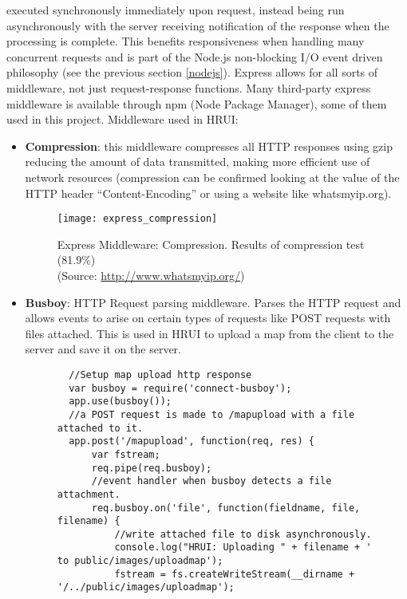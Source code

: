 executed synchronously immediately upon request, instead being run asynchronously with the server receiving notification of the response
when the processing is complete. This benefits responsiveness when handling many concurrent requests and is part of the Node.js
non-blocking I/O event driven philosophy (see the previous section \ref{nodejs}). Express allows for all sorts of middleware, not just
request-response functions. Many third-party express middleware is available through npm (Node Package Manager), some of them used in
this project. Middleware used in HRUI:
\begin{itemize}
  \item \textbf{Compression}: this middleware compresses all HTTP responses using gzip reducing the amount of data transmitted, making
  more efficient use of network resources (compression can be confirmed looking at the value of the HTTP header ``Content-Encoding'' or
  using a website like whatsmyip.org).
  \begin{figure}[H]
  \captionsetup{justification=centering}
  \begin{center}
    \texttt{[image: express\_compression]}
  \end{center}
  \caption{Express Middleware: Compression. Results of compression test (81.9\%)\\(Source: \url{http://www.whatsmyip.org/})}
  \end{figure}
  \item \textbf{Busboy}: HTTP Request parsing middleware. Parses the HTTP request and allows events to arise on certain types of
  requests like POST requests with files attached. This is used in HRUI to upload a map from the client to the server and save it on the
  server.
  \begin{figure}[H]
  \centering
  \captionsetup{justification=centering}
  \begin{verbatim}
  //Setup map upload http response
  var busboy = require('connect-busboy');
  app.use(busboy());
  //a POST request is made to /mapupload with a file attached to it.
  app.post('/mapupload', function(req, res) {
      var fstream;
      req.pipe(req.busboy);
      //event handler when busboy detects a file attachment.
      req.busboy.on('file', function(fieldname, file, filename) {
          //write attached file to disk asynchronously.
          console.log("HRUI: Uploading " + filename + ' to public/images/uploadmap');
          fstream = fs.createWriteStream(__dirname + '/../public/images/uploadmap');

\end{verbatim}
\end{figure}
\end{itemize}
